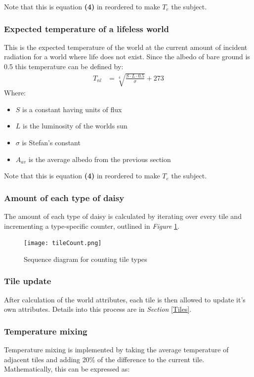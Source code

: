 \documentclass[12pt]{article}
\begin{document}
Note that this is equation {\bf (4)} in \cite{watson1983} reordered to
make $T_e$ the subject.

\subsubsection{Expected temperature of a lifeless world}
This is the expected temperature of the world at the current amount of
incident radiation for a world where life does not exist. Since the
albedo of bare ground is 0.5\cite{watson1983} this temperature can be
defined by:
\begin{align}
  T_{nl} &= \sqrt[4]{\frac{S\cdot L  \cdot 0.5}{\sigma}} + 273
\end{align}
Where:
\begin{itemize}
\item $S$ is a constant having units of flux
\item $L$ is the luminosity of the worlds sun
\item $\sigma$ is Stefan's constant
\item $A_{av}$ is the average albedo from the previous section
\end{itemize}

Note that this is equation {\bf (4)} in \cite{watson1983} reordered to
make $T_e$ the subject.


\subsubsection{Amount of each type of daisy}
The amount of each type of daisy is calculated by iterating over every
tile and incrementing a type-specific counter, outlined in \emph{Figure} \ref{fig:tileCount}.
\begin{figure}[h]
  \centering
  \texttt{[image: tileCount.png]}
  \caption{Sequence diagram for counting tile types}
  \label{fig:tileCount}
\end{figure}

\subsubsection{Tile update}
After calculation of the world attributes, each tile is then allowed
to update it's own attributes. Details into this process are in
\emph{Section} \ref{Tiles}.

\subsubsection{Temperature mixing}
Temperature mixing is implemented by taking the average temperature of
adjacent tiles and adding 20\% of the difference to the current tile.
Mathematically, this can be expressed as:
\end{document}
